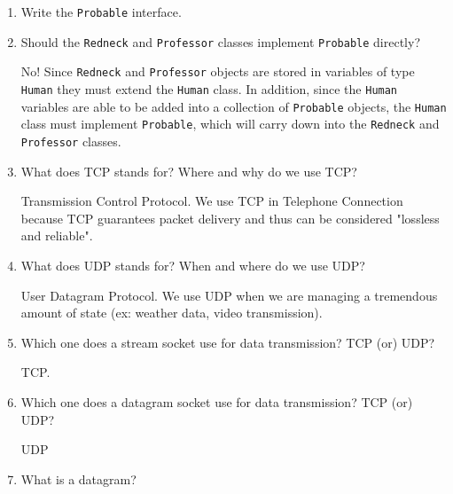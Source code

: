 \documentclass[11pt]{article}
\newenvironment{answer}{\large\lstset{basicstyle=\tiny\ttfamily}\color{white}}{}
\newenvironment{answer}{\large\lstset{basicstyle=\large\ttfamily}\color{red}}{}
\begin{document}
\begin{enumerate}
\begin{enumerate}
\item Write the \texttt{Probable} interface.

\begin{answer}

\end{answer}

\item Should the \texttt{Redneck} and \texttt{Professor} classes implement \texttt{Probable} directly?

\begin{answer}
No!
Since \texttt{Redneck} and \texttt{Professor} objects are stored in variables of type \texttt{Human} they must extend the \texttt{Human} class.
In addition, since the \texttt{Human} variables are able to be added into a collection of \texttt{Probable} objects, the \texttt{Human} class must implement \texttt{Probable}, which will carry down into the \texttt{Redneck} and \texttt{Professor} classes.
\end{answer}

\item What does TCP stands for? Where and why do we use TCP?

\begin{answer}
Transmission Control Protocol. We use TCP in Telephone Connection because TCP guarantees packet delivery and thus can be considered "lossless and reliable".
\end{answer}

\item What does UDP stands for? When and where do we use UDP?

\begin{answer}
User Datagram Protocol. We use UDP when we are managing a tremendous amount of state (ex: weather data, video transmission).
\end{answer}

\item Which one does a stream socket use for data transmission? TCP (or) UDP?

\begin{answer}
TCP. 
\end{answer}

\item Which one does a datagram socket use for data transmission? TCP (or) UDP?

\begin{answer}
UDP
\end{answer}

\item What is a datagram?


\end{enumerate}
\end{enumerate}
\end{document}
